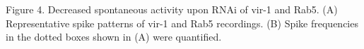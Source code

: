 Figure 4. Decreased spontaneous activity upon RNAi of vir-1 and Rab5. (A) Representative spike patterns of vir-1 and Rab5 recordings. (B) Spike frequencies in the dotted boxes shown in (A) were quantified.